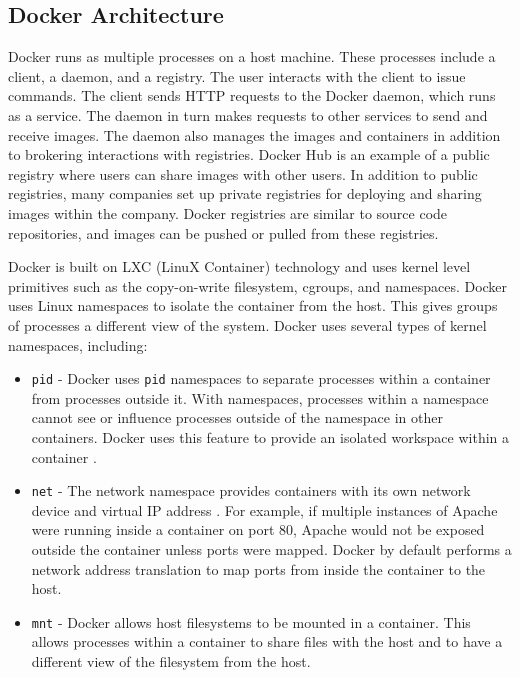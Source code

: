 \documentclass[11pt]{article}
\begin{document}
	\subsection{Docker Architecture}
	Docker runs as multiple processes on a host machine. These processes include a client, a daemon, and a registry. The user interacts with the client to issue commands. The client sends HTTP requests to the Docker daemon, which runs as a service. The daemon in turn makes requests to other services to send and receive images. The daemon also manages the images and containers in addition to brokering interactions with registries. Docker Hub is an example of a public registry where users can share images with other users. In addition to public registries, many companies set up private registries for deploying and sharing images within the company. Docker registries are similar to source code repositories, and images can be pushed or pulled from these registries.
	
	Docker is built on LXC (LinuX Container) technology \cite{merkel} and uses kernel level primitives such as the copy-on-write filesystem, cgroups, and namespaces. Docker uses Linux namespaces to isolate the container from the host. This gives groups of processes a different view of the system. Docker uses several types of kernel namespaces, including:
	\begin{itemize}
		\item \texttt{pid} - Docker uses \texttt{pid} namespaces to separate processes within a container from processes outside it. With namespaces, processes within a namespace cannot see or influence processes outside of the namespace in other containers. Docker uses this feature to provide an isolated workspace within a container \cite{rosen}.
		\item \texttt{net} - The network namespace provides containers with its own network device and virtual IP address \cite{anderson}. For example, if multiple instances of Apache were running inside a container on port 80, Apache would not be exposed outside the container unless ports were mapped. Docker by default performs a network address translation to map ports from inside the container to the host.
		\item \texttt{mnt} - Docker allows host filesystems to be mounted in a container. This allows processes within a container to share files with the host and to have a different view of the filesystem from the host.
	\end{itemize}
	
\end{document}
